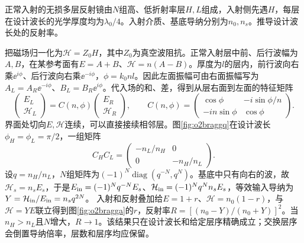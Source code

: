 \begin{exercise}\label{ex:o2bragg}
正常入射的无损多层反射镜由$N$组高、低折射率层$H,L$组成，入射侧先遇$H$，每层在设计波长的光学厚度均为$\lambda_0/4$。入射介质、基底导纳分别为$n_0,n_s$。推导设计波长处的反射率。
\end{exercise}
\begin{solution}
把磁场归一化为$\mathcal H=Z_0H$，其中$Z_0$为真空波阻抗。正常入射层中前、后行波幅为$A,B$，在某参考面有$E=A+B$、$\mathcal H=n(A-B)$。厚度为$l$的层内，前行波向右乘$\ee^{i\phi}$、后行波向右乘$\ee^{-i\phi}$，$\phi=k_0nl$。因此左面振幅可由右面振幅写为$A_L=A_R\ee^{-i\phi}$、$B_L=B_R\ee^{i\phi}$。代入场的和、差，得到从层右面到左面的特征矩阵
\[
 \begin{pmatrix}E_L\\\mathcal H_L\end{pmatrix}
 =C(n,\phi)\begin{pmatrix}E_R\\\mathcal H_R\end{pmatrix},\qquad
 C(n,\phi)=\begin{pmatrix}\cos\phi&-i\sin\phi/n\\
 -in\sin\phi&\cos\phi\end{pmatrix}.
\]
界面处切向$E,\mathcal H$连续，可以直接接续相邻层。图\ref{fig:o2braggq}在设计波长$\phi_H=\phi_L=\pi/2$，一组矩阵
\[
 C_HC_L=\begin{pmatrix}-n_L/n_H&0\\0&-n_H/n_L\end{pmatrix}.
\]
设$q=n_H/n_L$，$N$组矩阵为$(-1)^N\operatorname{diag}(q^{-N},q^N)$。基底中只有向右的波，故$\mathcal H_s=n_sE_s$，于是$E_{\rm in}=(-1)^Nq^{-N}E_s$、$\mathcal H_{\rm in}=(-1)^Nq^Nn_sE_s$，等效输入导纳为$Y=\mathcal H_{\rm in}/E_{\rm in}=n_sq^{2N}$。
入射和反射叠加给$E=1+r$、$\mathcal H=n_0(1-r)$，与$\mathcal H=YE$联立得到图\ref{fig:o2bragga}的$r$，反射率$R=[(n_0-Y)/(n_0+Y)]^2$。当$n_H>n_L$且$N$增大，$R\to1$。该结果只在设计波长和给定层序精确成立；交换层序会倒置导纳倍率，层数和层序均应保留。
\end{solution}

